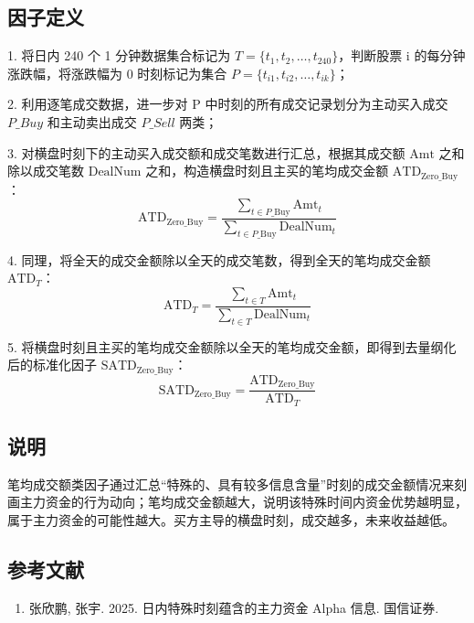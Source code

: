 \documentclass{article}
\begin{document}
\subsection{因子定义}

1. 将日内 240 个 1 分钟数据集合标记为 \( T = \{t_1, t_2, \dots, t_{240}\} \)，判断股票 i 的每分钟涨跌幅，将涨跌幅为 0 时刻标记为集合 \( P = \{t_{i1}, t_{i2}, \dots, t_{ik}\} \)；

2. 利用逐笔成交数据，进一步对 P 中时刻的所有成交记录划分为主动买入成交 \( P\_Buy \) 和主动卖出成交 \( P\_Sell \) 两类；

3. 对横盘时刻下的主动买入成交额和成交笔数进行汇总，根据其成交额 \( \mathrm{Amt} \) 之和除以成交笔数 \( \mathrm{DealNum}\) 之和，构造横盘时刻且主买的笔均成交金额 \( \mathrm{ATD}_{\mathrm{Zero\_Buy}} \)：
\begin{equation}
    \mathrm{ATD}_{\mathrm{Zero\_Buy}} = \frac{\sum_{t \in P\_\mathrm{Buy}} \mathrm{Amt}_t}{\sum_{t \in P\_\mathrm{Buy}} \mathrm{DealNum}_t}
\end{equation}

4. 同理，将全天的成交金额除以全天的成交笔数，得到全天的笔均成交金额 \( \mathrm{ATD}_T \)：
\begin{equation}
    \mathrm{ATD}_T = \frac{\sum_{t \in T} \mathrm{Amt}_t}{\sum_{t \in T} \mathrm{DealNum}_t}
\end{equation}

5. 将横盘时刻且主买的笔均成交金额除以全天的笔均成交金额，即得到去量纲化后的标准化因子 \( \mathrm{SATD}_{\mathrm{Zero\_Buy}} \)：
\begin{equation}
    \mathrm{SATD}_{\mathrm{Zero\_Buy}} = \frac{\mathrm{ATD}_{\mathrm{Zero\_Buy}}}{\mathrm{ATD}_T}
\end{equation}

\subsection{说明}
笔均成交额类因子通过汇总“特殊的、具有较多信息含量”时刻的成交金额情况来刻画主力资金的行为动向；笔均成交金额越大，说明该特殊时间内资金优势越明显，属于主力资金的可能性越大。买方主导的横盘时刻，成交越多，未来收益越低。

\subsection{参考文献}
\begin{enumerate}
    \item 张欣鹏, 张宇. 2025. 日内特殊时刻蕴含的主力资金 Alpha 信息. 国信证券.
\end{enumerate}
\end{document}

